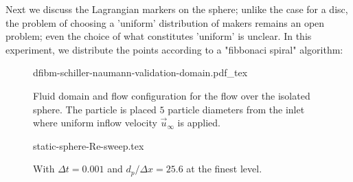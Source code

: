 Next we discuss the Lagrangian markers on the sphere; unlike the case for a
disc, the problem of choosing a 'uniform' distribution of makers remains an
open problem\autocite{saff_distributing_1997}; even the choice of what
constitutes 'uniform' is unclear. In this experiment, we distribute the points
according to a "fibbonaci spiral" algorithm:


\begin{figure}[H]
    \centering
    \def\svgwidth{0.5\textwidth}
    {dfibm-schiller-naumann-validation-domain.pdf_tex}
    \caption{Fluid domain and flow configuration for the flow over the isolated sphere. The particle is placed \(5\) particle diameters from the inlet where uniform inflow velocity \(\vec u_\infty\) is applied.}
    \label{fig:mdfibm-schiller-naumann-validation-domain-setup}
\end{figure}

\begin{figure}[H]
    \centering
    {static-sphere-Re-sweep.tex}
    \caption{With \(\Delta t = 0.001\) and \(d_p / \Delta x = 25.6\) at the finest level.}
    \label{fig:mdfibm-schiller-naumann-validation-Re-sweep}
\end{figure}

